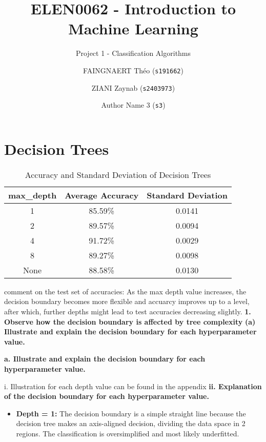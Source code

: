 \documentclass[acmconf,nonacm=true]{acmart}
\begin{document}
\title{ELEN0062 - Introduction to Machine Learning}
\subtitle{Project 1 - Classification Algorithms}

\author{FAINGNAERT Théo (\texttt{s191662})}
\author{ZIANI Zaynab (\texttt{s2403973})}
\author{Author Name 3 (\texttt{s3})}

\maketitle

\section{Decision Trees}

\begin{table}[H]
    \centering
    \caption{Accuracy and Standard Deviation of Decision Trees}
    \begin{tabular}{|c|c|c|}
    \hline
     max\_depth & Average Accuracy & Standard Deviation \\
    \hline
    1 & 85.59\%&  0.0141\\
    2 & 89.57\%&  0.0094\\
    4 & 91.72\%&  0.0029\\
    8 & 89.27\%&  0.0098\\
    None & 88.58\%&  0.0130\\
    \hline
    \end{tabular}
\end{table}
comment on the test set of accuracies: 
As the max depth value increases, the decision boundary becomes more flexible and accuarcy improves up to a level, after which, further depths might lead to test accuracies decreasing slightly.
\textbf{1. Observe how the decision boundary is affected by tree complexity}
\textbf{(a) Illustrate and explain the decision boundary for each hyperparameter value.}
\begin{enumerate}
    \textbf{a.  Illustrate and explain the decision boundary for each hyperparameter
value.}
\end{enumerate}
    i. Illustration for each depth value can be found in the appendix
    \textbf{ii. Explanation of the decision boundary for each hyperparameter value.}
    \begin{itemize}
        \item \textbf{Depth = 1: }The decision boundary is a simple straight line because the decision tree makes an axis-aligned decision, dividing the data space in 2 regions. The classification is oversimplified and most likely underfitted.
    \end{itemize}
\end{document}
